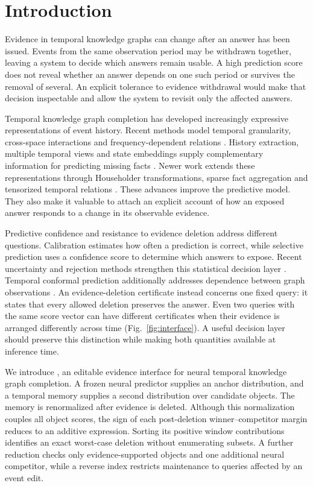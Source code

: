 \section{Introduction}
Evidence in temporal knowledge graphs can change after an answer has been issued. Events from the same observation period may be withdrawn together, leaving a system to decide which answers remain usable. A high prediction score does not reveal whether an answer depends on one such period or survives the removal of several. An explicit tolerance to evidence withdrawal would make that decision inspectable and allow the system to revisit only the affected answers.



Temporal knowledge graph completion has developed increasingly expressive representations of event history. Recent methods model temporal granularity, cross-space interactions and frequency-dependent relations \citep{geng2025granularity,vu2025tcrosse,liu2025terdy}. History extraction, multiple temporal views and state embeddings supply complementary information for predicting missing facts \citep{dao2025hgct,chen2025dualview,ji2025stse}. Newer work extends these representations through Householder transformations, sparse fact aggregation and tensorized temporal relations \citep{xu2026householder,zhu2026splices,lee2026tirano}. These advances improve the predictive model. They also make it valuable to attach an explicit account of how an exposed answer responds to a change in its observable evidence.

Predictive confidence and resistance to evidence deletion address different questions. Calibration estimates how often a prediction is correct, while selective prediction uses a confidence score to determine which answers to expose. Recent uncertainty and rejection methods strengthen this statistical decision layer \citep{liu2025uncertkg,li2025vicinal,szabadvary2025reject,he2025conjunction}. Temporal conformal prediction additionally addresses dependence between graph observations \citep{wang2025nonexchangeable}. An evidence-deletion certificate instead concerns one fixed query: it states that every allowed deletion preserves the answer. Even two queries with the same score vector can have different certificates when their evidence is arranged differently across time (Fig.~\ref{fig:interface}). A useful decision layer should preserve this distinction while making both quantities available at inference time.

We introduce \StableKG{}, an editable evidence interface for neural temporal knowledge graph completion. A frozen neural predictor supplies an anchor distribution, and a temporal memory supplies a second distribution over candidate objects. The memory is renormalized after evidence is deleted. Although this normalization couples all object scores, the sign of each post-deletion winner--competitor margin reduces to an additive expression. Sorting its positive window contributions identifies an exact worst-case deletion without enumerating subsets. A further reduction checks only evidence-supported objects and one additional neural competitor, while a reverse index restricts maintenance to queries affected by an event edit.

